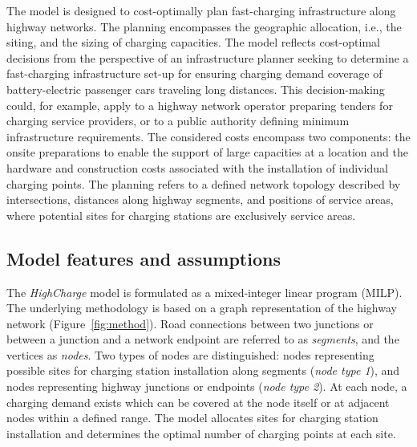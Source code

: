             The model is designed to cost-optimally plan fast-charging infrastructure along highway networks. The planning encompasses the geographic allocation, i.e., the siting, and the sizing of charging capacities. The model reflects cost-optimal decisions from the perspective of an infrastructure planner seeking to determine a fast-charging infrastructure set-up for ensuring charging demand coverage of battery-electric passenger cars traveling long distances. This decision-making could, for example, apply to a highway network operator preparing tenders for charging service providers, or to a public authority defining minimum infrastructure requirements. The considered costs encompass two components: the onsite preparations to enable the support of large capacities at a location and the hardware and construction costs associated with the installation of individual charging points. The planning refers to a defined network topology described by intersections, distances along highway segments, and positions of service areas, where potential sites for charging stations are exclusively service areas.

            \subsection{Model features and assumptions}
            The \textit{HighCharge} model is formulated as a mixed-integer linear program (MILP). The underlying methodology is based on a graph representation of the highway network (Figure~\ref{fig:method}). Road connections between two junctions or between a junction and a network endpoint are referred to as \textit{segments}, and the vertices as \textit{nodes}. Two types of nodes are distinguished: nodes representing possible sites for charging station installation along segments (\textit{node type 1}), and nodes representing highway junctions or endpoints (\textit{node type 2}). At each node, a charging demand exists which can be covered at the node itself or at adjacent nodes within a defined range. The model allocates sites for charging station installation and determines the optimal number of charging points at each site.

